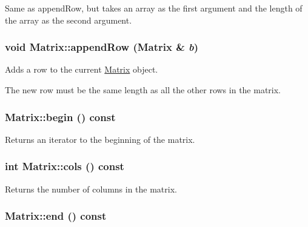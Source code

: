 Same as appendRow, but takes an array as the first argument and the length of the array as the second argument. 

\hypertarget{class_matrix_a20c175983a6b23a83fccfe8f726b3b07}{
\subsubsection[{appendRow}]{\setlength{\rightskip}{0pt plus 5cm}void Matrix::appendRow ({\bf Matrix} \& {\em b})}}
\label{class_matrix_a20c175983a6b23a83fccfe8f726b3b07}


Adds a row to the current \hyperlink{class_matrix}{Matrix} object. 

The new row must be the same length as all the other rows in the matrix. \hypertarget{class_matrix_a8969f52f950b124d5a40128c3df11efe}{
\subsubsection[{begin}]{ Matrix::begin () const}}
\label{class_matrix_a8969f52f950b124d5a40128c3df11efe}


Returns an iterator to the beginning of the matrix. 

\hypertarget{class_matrix_ac9586a9d7bba127292ce84b1e8ee9cc1}{
\subsubsection[{cols}]{\setlength{\rightskip}{0pt plus 5cm}int Matrix::cols () const}}
\label{class_matrix_ac9586a9d7bba127292ce84b1e8ee9cc1}


Returns the number of columns in the matrix. 

\hypertarget{class_matrix_aa6e886dcd213fdf5c54743f3b8ac7209}{
\subsubsection[{end}]{ Matrix::end () const}}
\label{class_matrix_aa6e886dcd213fdf5c54743f3b8ac7209}


